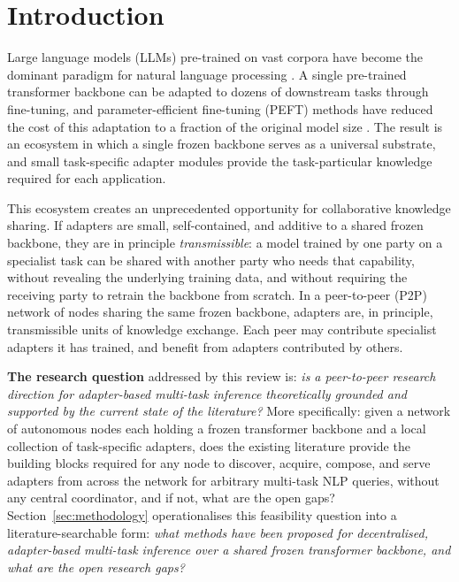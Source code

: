 \section{Introduction}
\label{sec:introduction}

Large language models (LLMs) pre-trained on vast corpora have become the dominant
paradigm for natural language processing \citep{Vaswani2017, Devlin2019}. A single
pre-trained transformer backbone can be adapted to dozens of downstream tasks through
fine-tuning, and parameter-efficient fine-tuning (PEFT) methods have reduced the cost
of this adaptation to a fraction of the original model size \citep{Houlsby2019, Hu2022}.
The result is an ecosystem in which a single frozen backbone serves as a universal
substrate, and small task-specific adapter modules provide the task-particular
knowledge required for each application.

This ecosystem creates an unprecedented opportunity for collaborative knowledge sharing.
If adapters are small, self-contained, and additive to a shared frozen backbone, they
are in principle \textit{transmissible}: a model trained by one party on a specialist
task can be shared with another party who needs that capability, without revealing
the underlying training data, and without requiring the receiving party to retrain the
backbone from scratch. In a peer-to-peer (P2P) network of nodes sharing the same
frozen backbone, adapters are, in principle, transmissible units of knowledge exchange. Each peer
may contribute specialist adapters it has trained, and benefit from adapters
contributed by others.

\textbf{The research question} addressed by this review is: \textit{is a
peer-to-peer research direction for adapter-based multi-task inference
theoretically grounded and supported by the current state of the literature?}
More specifically: given a network of autonomous nodes each holding a frozen
transformer backbone and a local collection of task-specific adapters, does the
existing literature provide the building blocks required for any node to
discover, acquire, compose, and serve adapters from across the network for
arbitrary multi-task NLP queries, without any central coordinator, and if
not, what are the open gaps?
Section~\ref{sec:methodology} operationalises this feasibility question into a literature-searchable form: \textit{what methods have been proposed 
for decentralised, adapter-based multi-task inference over a shared frozen 
transformer backbone, and what are the open research gaps?}

